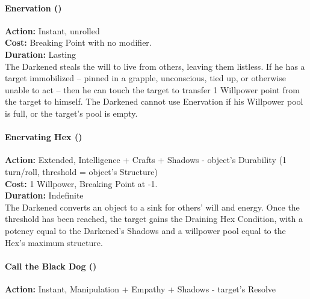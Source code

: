 \paragraph*{Enervation (\textbullet)}

\noindent \textbf{Action:} Instant, unrolled \\

\noindent \textbf{Cost:} Breaking Point with no modifier. \\

\noindent \textbf{Duration:} Lasting \\

\noindent The Darkened steals the will to live from others, leaving them listless. If he has a target immobilized -- pinned in a grapple, unconscious, tied up, or otherwise unable to act -- then he can touch the target to transfer 1 Willpower point from the target to himself. The Darkened cannot use Enervation if his Willpower pool is full, or the target's pool is empty. \\

\paragraph*{Enervating Hex (\textbullet\textbullet)}

\noindent \textbf{Action:} Extended, Intelligence + Crafts + Shadows - object's Durability (1 turn/roll, threshold = object's Structure) \\

\noindent \textbf{Cost:} 1 Willpower, Breaking Point at -1.\\

\noindent \textbf{Duration:} Indefinite \\

The Darkened converts an object to a sink for others' will and energy. Once the threshold has been reached, the target gains the Draining Hex Condition, with a potency equal to the Darkened's Shadows and a willpower pool equal to the Hex's maximum structure.\\

\paragraph*{Call the Black Dog (\textbullet\textbullet\textbullet)} 

\noindent \textbf{Action:} Instant, Manipulation + Empathy + Shadows - target's Resolve\\

